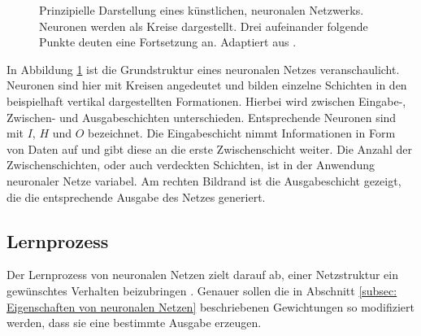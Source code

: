 \begin{figure}[H]
				\caption{Prinzipielle Darstellung eines künstlichen, neuronalen Netzwerks. Neuronen werden als Kreise dargestellt. Drei aufeinander folgende Punkte deuten eine Fortsetzung an. Adaptiert aus \cite{neuron}.}
				\label{fig: neuronales netz }
		\end{figure}
	
		
		In Abbildung \ref{fig: neuronales netz } ist die Grundstruktur eines neuronalen Netzes veranschaulicht. Neuronen sind hier mit Kreisen angedeutet und bilden einzelne Schichten in den beispielhaft vertikal dargestellten Formationen. Hierbei wird zwischen Eingabe-, Zwischen- und Ausgabeschichten unterschieden. Entsprechende Neuronen sind mit $I$, $H$ und $O$ bezeichnet. Die Eingabeschicht nimmt Informationen in Form von Daten auf und gibt diese an die erste Zwischenschicht weiter. Die Anzahl der Zwischenschichten, oder auch verdeckten Schichten, ist in der Anwendung neuronaler Netze variabel. Am rechten Bildrand ist die Ausgabeschicht gezeigt, die die entsprechende Ausgabe des Netzes generiert.  
	
		\subsection{Lernprozess}
		Der Lernprozess von neuronalen Netzen zielt darauf ab, einer Netzstruktur ein gewünschtes Verhalten beizubringen \cite{proba}. Genauer sollen die in Abschnitt \ref{subsec: Eigenschaften von neuronalen Netzen} beschriebenen Gewichtungen so modifiziert werden, dass sie eine bestimmte Ausgabe erzeugen.\\
		
